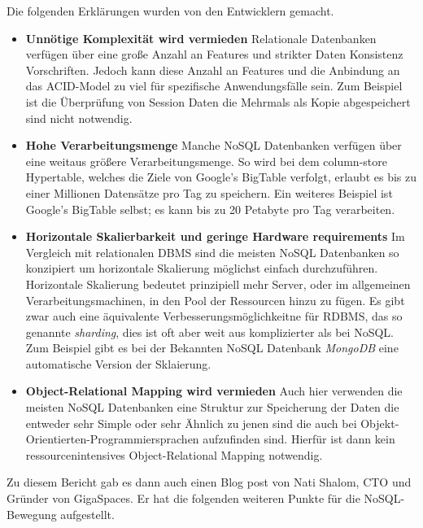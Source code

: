 Die folgenden Erklärungen wurden von den Entwicklern gemacht.
\begin{itemize}
	\item \textbf{Unnötige Komplexität wird vermieden}\newline
	 Relationale Datenbanken verfügen über eine große Anzahl an Features und strikter Daten Konsistenz Vorschriften. Jedoch kann diese Anzahl an Features und die Anbindung an das ACID-Model zu viel für spezifische Anwendungsfälle sein. Zum Beispiel ist die Überprüfung von Session Daten die Mehrmals als Kopie abgespeichert sind nicht notwendig.

	\item \textbf{Hohe Verarbeitungsmenge}\newline
	 Manche NoSQL Datenbanken verfügen über eine weitaus größere 	Verarbeitungsmenge. So wird bei dem column-store Hypertable, welches die Ziele von Google’s BigTable verfolgt, erlaubt es bis zu einer Millionen Datensätze pro Tag zu speichern. Ein weiteres Beispiel ist Google’s BigTable selbst; es kann bis zu 20 Petabyte pro Tag verarbeiten.

	\item \textbf{Horizontale Skalierbarkeit und geringe Hardware requirements}\newline
	 Im Vergleich mit relationalen DBMS sind die meisten NoSQL Datenbanken so konzipiert um horizontale Skalierung möglichst einfach durchzuführen. Horizontale Skalierung bedeutet prinzipiell mehr Server, oder im allgemeinen Verarbeitungsmachinen, in den Pool der Ressourcen hinzu zu fügen. Es gibt zwar auch eine äquivalente Verbesserungsmöglichkeitne für RDBMS, das so genannte \textit{sharding}, dies ist oft aber weit aus komplizierter als bei NoSQL. Zum Beispiel gibt es bei der Bekannten NoSQL Datenbank \textit{MongoDB} eine automatische Version der Sklaierung.

	\item \textbf{Object-Relational Mapping wird vermieden}\newline
	 Auch hier verwenden die meisten NoSQL Datenbanken eine Struktur zur Speicherung der Daten die entweder sehr Simple oder sehr Ähnlich zu jenen sind die auch bei Objekt-Orientierten-Programmiersprachen aufzufinden sind. Hierfür ist dann kein ressourcenintensives Object-Relational Mapping notwendig.
\end{itemize}

Zu diesem Bericht gab es dann auch einen Blog post von Nati Shalom, CTO und Gründer von GigaSpaces. Er hat die folgenden weiteren Punkte für die NoSQL-Bewegung aufgestellt\cite{MELD.CH2-noSQL.natiShalomlol}.

